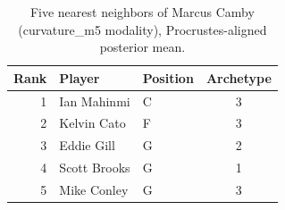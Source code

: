 \begin{table}[htbp]
  \centering\small
  \begin{tabular}{rllc}
    \toprule
    Rank & Player & Position & Archetype \\
    \midrule
    1 & Ian Mahinmi & C & 3 \\
    2 & Kelvin Cato & F & 3 \\
    3 & Eddie Gill & G & 2 \\
    4 & Scott Brooks & G & 1 \\
    5 & Mike Conley & G & 3 \\
    \bottomrule
  \end{tabular}
  \caption{Five nearest neighbors of Marcus Camby (curvature_m5 modality), Procrustes-aligned posterior mean.}
  \label{tab:Marcus_Camby_neighbors_curvature_m5}
\end{table}

